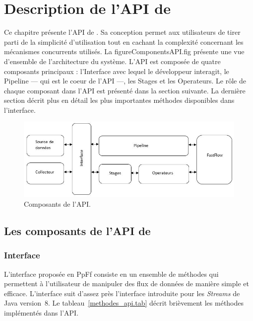 
\chapter{Description de l'API de \PpFf}
\label{description.chap}

Ce chapitre pr\'esente l'API de \ppff. Sa conception permet aux utilisateurs de tirer parti de la simplicit\'e d'utilisation tout en cachant la complexit\'e concernant les m\'ecanismes concurrents utilis\'es. La figure{ComponentsAPI.fig} pr\'esente une vue d'ensemble de l'architecture du syst\`eme. L'API est compos\'ee de quatre composants principaux : l'Interface avec lequel le d\'eveloppeur interagit, le Pipeline --- qui est le coeur de l'API ---, les Stages et les Operateurs. Le r\^ole de chaque composant dans l'API est pr\'esent\'e dans la section suivante. La derni\`ere section  d\'ecrit plus en d\'etail les plus importantes m\'ethodes disponibles dans l'interface.



\begin{figure}[ht]
\centering
     \includegraphics[width=1.0\textwidth]{Figures/ComponentsAPI.jpg}
      \caption{Composants de l'API.}
       \label{ComponentsAPI.fig}
\end{figure}


\section{Les composants de l'API de \ppff}

\subsection{Interface}

L'interface propos\'ee en PpFf consiste en un ensemble de m\'ethodes qui permettent \`a l'utilisateur de manipuler des flux de donn\'ees de mani\`ere simple et efficace. L'interface suit d'assez pr\`es l'interface introduite pour les \emph{Streams} de Java version~8. Le tableau~\ref{methodes_api.tab} d\'ecrit bri\`evement les m\'ethodes impl\'ement\'es dans l'API.



